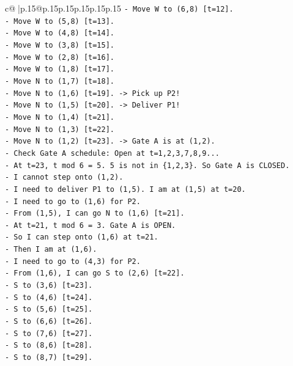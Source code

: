 \documentclass{article}
\begin{document}
{\begin{supertabular}{c@{$\;$}|p{.15\linewidth}@{}p{.15\linewidth}p{.15\linewidth}p{.15\linewidth}p{.15\linewidth}p{.15\linewidth}}
{{{\texttt{{-} Move W to (6,8) {[}t=12{]}.} \\
\texttt{{-} Move W to (5,8) {[}t=13{]}.} \\
\texttt{{-} Move W to (4,8) {[}t=14{]}.} \\
\texttt{{-} Move W to (3,8) {[}t=15{]}.} \\
\texttt{{-} Move W to (2,8) {[}t=16{]}.} \\
\texttt{{-} Move W to (1,8) {[}t=17{]}.} \\
\texttt{{-} Move N to (1,7) {[}t=18{]}.} \\
\texttt{{-} Move N to (1,6) {[}t=19{]}. {-}> Pick up P2!} \\
\texttt{{-} Move N to (1,5) {[}t=20{]}. {-}> Deliver P1!} \\
\texttt{{-} Move N to (1,4) {[}t=21{]}.} \\
\texttt{{-} Move N to (1,3) {[}t=22{]}.} \\
\texttt{{-} Move N to (1,2) {[}t=23{]}. {-}> Gate A is at (1,2).} \\
\texttt{{-} Check Gate A schedule: Open at t=1,2,3,7,8,9...} \\
\texttt{{-} At t=23, t mod 6 = 5. 5 is not in \{1,2,3\}. So Gate A is CLOSED.} \\
\texttt{{-} I cannot step onto (1,2).} \\
\texttt{{-} I need to deliver P1 to (1,5). I am at (1,5) at t=20.} \\
\texttt{{-} I need to go to (1,6) for P2.} \\
\texttt{{-} From (1,5), I can go N to (1,6) {[}t=21{]}.} \\
\texttt{{-} At t=21, t mod 6 = 3. Gate A is OPEN.} \\
\texttt{{-} So I can step onto (1,6) at t=21.} \\
\texttt{{-} Then I am at (1,6).} \\
\texttt{{-} I need to go to (4,3) for P2.} \\
\texttt{{-} From (1,6), I can go S to (2,6) {[}t=22{]}.} \\
\texttt{{-} S to (3,6) {[}t=23{]}.} \\
\texttt{{-} S to (4,6) {[}t=24{]}.} \\
\texttt{{-} S to (5,6) {[}t=25{]}.} \\
\texttt{{-} S to (6,6) {[}t=26{]}.} \\
\texttt{{-} S to (7,6) {[}t=27{]}.} \\
\texttt{{-} S to (8,6) {[}t=28{]}.} \\
\texttt{{-} S to (8,7) {[}t=29{]}.} \\
}}}
\end{supertabular}}
\end{document}
